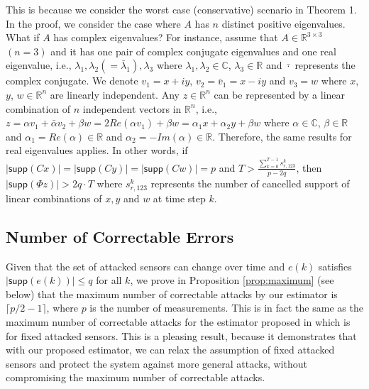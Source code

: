 \documentclass[../../thesis.tex]{subfiles}
\begin{document}
This is because we consider the worst case (conservative) scenario in Theorem 1. 
In the proof, we consider the case where $A$ has $n$ distinct positive eigenvalues. What if $A$ has complex eigenvalues? For instance, assume that $A \in \mathbb{R}^{3\times 3}$ $(n=3)$ and it has one pair of complex conjugate eigenvalues and one real eigenvalue, i.e., $\lambda_1, \lambda_2 (= \bar \lambda_1), \lambda_3$ where $\lambda_1, \lambda_2 \in \mathbb{C}$, $\lambda_3 \in \mathbb{R}$ and $\bar \cdot$ represents the complex conjugate. We denote $v_1 = x+ i y$, $v_2 = \bar v_1 = x - i y$ and $v_3 = w$ where $x$, $y$, $w  \in \mathbb{R}^n $ are linearly independent. Any $z \in \mathbb{R}^n$ can be represented by a linear combination of $n$ independent vectors in $\mathbb{R}^n$, i.e., $z = \alpha v_1 + \bar \alpha  v_2 + \beta w  = 2 Re( \alpha v_1) + \beta w =  \alpha_1 x + \alpha _2 y + \beta w$ where $\alpha \in \mathbb{C}$, $\beta \in \mathbb{R}$ and $\alpha_1 = Re(\alpha)\in \mathbb{R}$ and $\alpha_2 = - Im(\alpha) \in \mathbb{R}$. Therefore, the same results for real eigenvalues applies. In other words, if $ \lvert \textsf{supp}( C x) \rvert = \lvert \textsf{supp}( C y) \rvert = \lvert \textsf{supp}( C w) \rvert = p$ and $T > \frac { \sum_{k=0}^{T-1} s_{r,123}^k} {p - 2q}$, then $\lvert \textsf{supp} (\Phi z) \rvert > 2 q \cdot T$ where $s_{r,123}^k $ represents the number of cancelled support of linear combinations of $x,y$ and $w$ at time step $k$.



\subsection{Number of Correctable Errors}\label{sec:max_q}

Given that the set of attacked sensors can change over time and $e(k)$ satisfies $\lvert \textsf{supp} (e(k)) \rvert \le q$ for all $k$, we prove in Proposition \ref{prop:maximum} (see below) that the maximum number of correctable attacks by our estimator is $\lceil p/2-1 \rceil$, where $p$ is the number of measurements. This is in fact the same as the maximum number of correctable attacks for the estimator proposed in \cite{Fawzi:2014} which is for fixed attacked sensors.
This is a pleasing result, because it demonstrates that with our proposed estimator, we can relax the assumption of fixed attacked sensors and protect the system against more general attacks, without compromising the maximum number of correctable attacks. 
\end{document}
